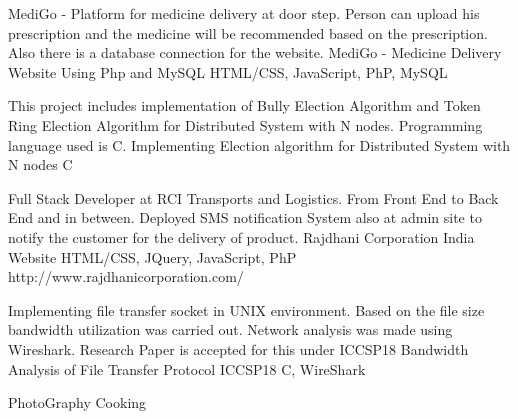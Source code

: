 \documentclass[]{awesome-cv}
\begin{document}
\vspace{-7mm}
\begin{cventries}
	\cventry
	{MediGo - Platform for medicine delivery at door step. Person can upload his prescription and the medicine will be recommended based on the prescription. Also there is a database connection for the website.}
	{MediGo - Medicine Delivery Website Using Php and MySQL}
	{HTML/CSS, JavaScript, PhP, MySQL}
	{}
	{}
	
	\vspace{-5mm}
	\cventry
	{This project includes implementation of Bully Election Algorithm and Token Ring Election Algorithm for Distributed System with N nodes. Programming language used is C.}
	{Implementing Election algorithm for Distributed System with N nodes}
	{C}
	{}
	{}
	
	\vspace{-5mm}
	\cventry
	{Full Stack Developer at RCI Transports and Logistics. From Front End to Back End and in between. Deployed SMS notification System also at admin site to notify the customer for the delivery of product.}
	{Rajdhani Corporation India Website}
	{HTML/CSS, JQuery, JavaScript, PhP}
	{http://www.rajdhanicorporation.com/}
	{}
	
	\vspace{-5mm}
	\cventry
	{Implementing file transfer socket in UNIX environment. Based on the file size bandwidth utilization was carried out. Network analysis was made using Wireshark. Research Paper is accepted for this under ICCSP\textquotesingle{}18}
	{Bandwidth Analysis of File Transfer Protocol ICCSP\textquotesingle{}18}
	{C, WireShark}
	{}
	{}
	
	\vspace{-5mm}
\end{cventries}
\begin{cvhonors}
	\cvhonor
	{PhotoGraphy}
	{}
	{}
	{}
	\cvhonor
	{Cooking}
	{}
	{}
	{}
\end{cvhonors}
\ 
\end{document}
